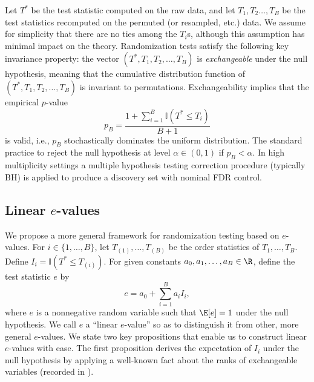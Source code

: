 \documentclass[12pt]{article}
\begin{document}
Let $T^*$ be the test statistic computed on the raw data, and let $T_1, T_2 \dots, T_B$ be the test statistics recomputed on the permuted (or resampled, etc.) data. We assume for simplicity that there are no ties among the $T_i$s, although this assumption has minimal impact on the theory.  Randomization tests satisfy the following key invariance property: the vector $(T^*, T_1, T_2, \dots, T_B)$ is \textit{exchangeable} under the null hypothesis, meaning that the cumulative distribution function of $(T^*, T_1, T_2, \dots, T_B)$ is invariant to permutations. Exchangeability implies that the empirical $p$-value
$$ p_B =  \frac{1 + \sum_{i=1}^B \mathbb{I}\left(T^* \leq T_i \right) }{B+1}$$ is valid, i.e., $p_B$ stochastically dominates the uniform distribution. The standard practice to reject the null hypothesis at level $\alpha \in (0,1)$ if $p_B < \alpha$. In high multiplicity settings a multiple hypothesis testing correction procedure (typically BH) is applied to produce a discovery set with nominal FDR control.

\subsection*{Linear $e$-values}


We propose a more general framework for randomization testing based on $e$-values. For $i \in \{1, \dots, B\}$, let $T_{(1)}, \dots, T_{(B)}$ be the order statistics of  $T_1, \dots, T_B$. Define $I_i = \mathbb{I}(T^* \leq T_{(i)}).$ For given constants $a_0, a_1, \dots, a_B \in \R$, define the test statistic $e$ by 
\begin{equation}\label{lin_e_def}
e = a_0 + \sum_{i=1}^B a_i I_i,
\end{equation}
 where $e$ is a nonnegative random variable such that $\E[e] = 1$ under the null hypothesis. We call $e$ a ``linear $e$-value'' so as to distinguish it from other, more general $e$-values. We state two key propositions that enable us to construct linear $e$-values with ease. The first proposition derives the expectation of $I_i$ under the null hypothesis by applying a well-known fact about the ranks of exchangeable variables (recorded in \cite{Kuchibhotla2020}).
\end{document}
